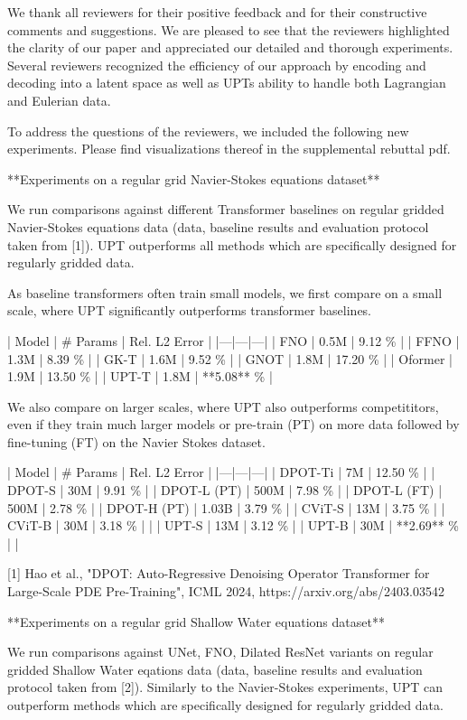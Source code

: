 We thank all reviewers for their positive feedback and for their constructive comments and suggestions.
We are pleased to see that the reviewers highlighted the clarity of our paper and appreciated our detailed and thorough experiments. Several reviewers recognized the efficiency of our approach by encoding and decoding into a latent space as well as UPTs ability to handle both Lagrangian and Eulerian data.



To address the questions of the reviewers, we included the following new experiments. Please find visualizations thereof in the supplemental rebuttal pdf.

**Experiments on a regular grid Navier-Stokes equations dataset**

We run comparisons against different Transformer baselines on regular gridded Navier-Stokes equations data (data, baseline results and evaluation protocol taken from [1]). UPT outperforms all methods which are specifically designed for regularly gridded data.

As baseline transformers often train small models, we first compare on a small scale, where UPT significantly outperforms transformer baselines.

| Model | # Params | Rel. L2 Error  |
|---|---|---|
| FNO | 0.5M | 9.12 \%  |
| FFNO | 1.3M | 8.39 \%  |
| GK-T |  1.6M | 9.52 \%  |
| GNOT |  1.8M | 17.20 \%  |
| Oformer | 1.9M |  13.50 \%  |
| UPT-T | 1.8M | **5.08** \%  |

We also compare on larger scales, where UPT also outperforms competititors, even if they train much larger models or pre-train (PT) on more data followed by fine-tuning (FT) on the Navier Stokes dataset.


| Model | # Params | Rel. L2 Error  |
|---|---|---|
| DPOT-Ti |  7M | 12.50 \%  |
| DPOT-S | 30M |  9.91 \%  |
| DPOT-L (PT) | 500M | 7.98 \%  |
| DPOT-L (FT) | 500M | 2.78 \%  |
| DPOT-H (PT) | 1.03B | 3.79 \%  |
| CViT-S | 13M | 3.75 \%  |
| CViT-B | 30M | 3.18 \%  |
| %
| UPT-S | 13M | 3.12 \%  |
| UPT-B | 30M | **2.69** \%  |
| %


[1] Hao et al., "DPOT: Auto-Regressive Denoising Operator Transformer for Large-Scale PDE Pre-Training", ICML 2024, https://arxiv.org/abs/2403.03542



**Experiments on a regular grid Shallow Water equations dataset**


We run comparisons against UNet, FNO, Dilated ResNet variants on regular gridded Shallow Water eqations data (data, baseline results and evaluation protocol taken from [2]). Similarly to the Navier-Stokes experiments, UPT can outperform methods which are specifically designed for regularly gridded data.


